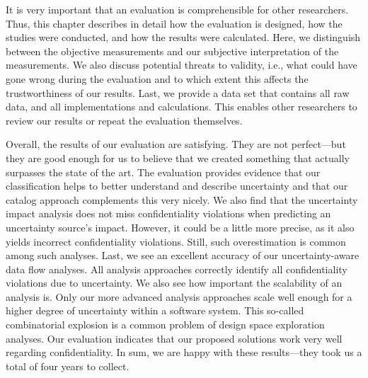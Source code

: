 It is very important that an evaluation is comprehensible for other researchers.
Thus, this chapter describes in detail how the evaluation is designed, how the studies were conducted, and how the results were calculated.
Here, we distinguish between the objective measurements and our subjective interpretation of the measurements.
We also discuss potential threats to validity, i.e., what could have gone wrong during the evaluation and to which extent this affects the trustworthiness of our results.
Last, we provide a data set \cite{dataset} that contains all raw data, and all implementations and calculations.
This enables other researchers to review our results or repeat the evaluation themselves.

Overall, the results of our evaluation are satisfying.
They are not perfect---but they are good enough for us to believe that we created something that actually surpasses the state of the art.
The evaluation provides evidence that our classification helps to better understand and describe uncertainty and that our catalog approach complements this very nicely.
We also find that the uncertainty impact analysis does not miss confidentiality violations when predicting an uncertainty source's impact.
However, it could be a little more precise, as it also yields incorrect confidentiality violations.
Still, such overestimation is common among such analyses.
Last, we see an excellent accuracy of our uncertainty-aware data flow analyses.
All analysis approaches correctly identify all confidentiality violations due to uncertainty.
We also see how important the scalability of an analysis is.
Only our more advanced analysis approaches scale well enough for a higher degree of uncertainty within a software system.
This so-called combinatorial explosion is a common problem of design space exploration analyses.
Our evaluation indicates that our proposed solutions work very well regarding confidentiality.
In sum, we are happy with these results---they took us a total of four years to collect.
